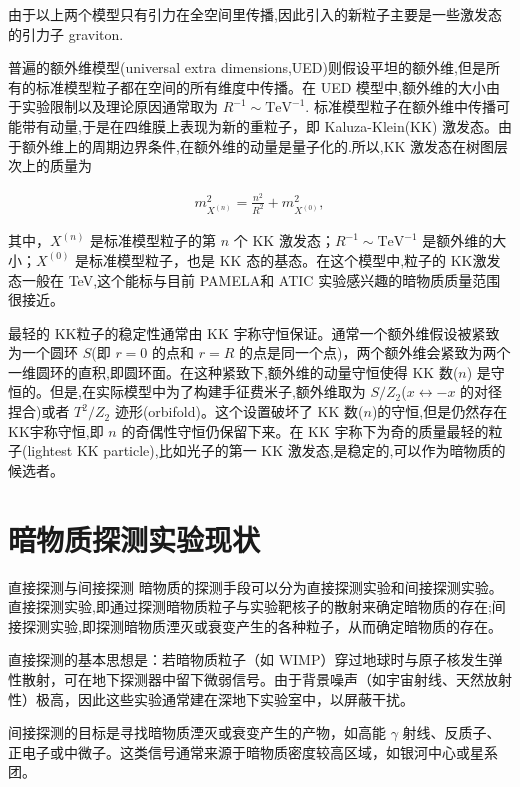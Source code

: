 \documentclass{beamer} %
\begin{document}
\begin{frame}
由于以上两个模型只有引力在全空间里传播,因此引入的新粒子主要是一些激发态的引力子 graviton.

普遍的额外维模型(universal extra dimensions,UED)则假设平坦的额外维,但是所有的标准模型粒子都在空间的所有维度中传播。在 UED 模型中,额外维的大小由于实验限制以及理论原因通常取为 $R^{-1} \sim \mathrm{TeV}^{-1} .$ 标准模型粒子在额外维中传播可能带有动量,于是在四维膜上表现为新的重粒子，即 Kaluza-Klein(KK) 激发态。由于额外维上的周期边界条件,在额外维的动量是量子化的.所以,KK 激发态在树图层次上的质量为

\begin{align}
m_{X^{(n)}}^2
=\frac{n^2 }{R^2 } + m_{X^{(0)}}^2,
\end{align}

其中，$X^{(n)} $ 是标准模型粒子的第 $n$ 个 KK 激发态；$R^{-1}\sim \mathrm{TeV}^{-1} $ 是额外维的大小；$X^{(0)}$ 是标准模型粒子，也是 KK 态的基态。在这个模型中,粒子的 KK激发态一般在 TeV,这个能标与目前 PAMELA和 ATIC 实验感兴趣的暗物质质量范围很接近。
\end{frame}

\begin{frame}
最轻的 KK粒子的稳定性通常由 KK 宇称守恒保证。通常一个额外维假设被紧致为一个圆环 $S$(即 $r=0$ 的点和 $r=R$ 的点是同一个点)，两个额外维会紧致为两个一维圆环的直积,即圆环面。在这种紧致下,额外维的动量守恒使得 KK 数($n$) 是守恒的。但是,在实际模型中为了构建手征费米子,额外维取为 $S/Z_2$($x\leftrightarrow -x$ 的对径捏合)或者 $T^2/Z_2$ 迹形(orbifold)。这个设置破坏了 KK 数($n$)的守恒,但是仍然存在 KK宇称守恒,即 $n$ 的奇偶性守恒仍保留下来。在 KK 宇称下为奇的质量最轻的粒子(lightest KK particle),比如光子的第一 KK 激发态,是稳定的,可以作为暗物质的候选者。
\end{frame}

\section{暗物质探测实验现状}

\begin{frame}{直接探测与间接探测}
暗物质的探测手段可以分为直接探测实验和间接探测实验。直接探测实验,即通过探测暗物质粒子与实验靶核子的散射来确定暗物质的存在;间接探测实验,即探测暗物质湮灭或衰变产生的各种粒子，从而确定暗物质的存在。

直接探测的基本思想是：若暗物质粒子（如 WIMP）穿过地球时与原子核发生弹性散射，可在地下探测器中留下微弱信号。由于背景噪声（如宇宙射线、天然放射性）极高，因此这些实验通常建在深地下实验室中，以屏蔽干扰。

间接探测的目标是寻找暗物质湮灭或衰变产生的产物，如高能 $\gamma$ 射线、反质子、正电子或中微子。这类信号通常来源于暗物质密度较高区域，如银河中心或星系团。
\end{frame}
\end{document}
